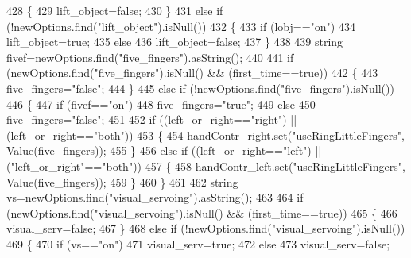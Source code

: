 \begin{DoxyCode}
428     \{
429         lift_object=\textcolor{keyword}{false};
430     \}
431     \textcolor{keywordflow}{else} \textcolor{keywordflow}{if} (!newOptions.find(\textcolor{stringliteral}{"lift\_object"}).isNull())
432     \{
433         \textcolor{keywordflow}{if} (lobj==\textcolor{stringliteral}{"on"})
434             lift_object=\textcolor{keyword}{true};
435         \textcolor{keywordflow}{else}
436             lift_object=\textcolor{keyword}{false};
437     \}
438 
439     \textcolor{keywordtype}{string} fivef=newOptions.find(\textcolor{stringliteral}{"five\_fingers"}).asString();
440 
441     \textcolor{keywordflow}{if} (newOptions.find(\textcolor{stringliteral}{"five\_fingers"}).isNull() && (first\_time==\textcolor{keyword}{true}))
442     \{
443         five\_fingers=\textcolor{stringliteral}{"false"};
444     \}
445     \textcolor{keywordflow}{else} \textcolor{keywordflow}{if} (!newOptions.find(\textcolor{stringliteral}{"five\_fingers"}).isNull())
446     \{
447         \textcolor{keywordflow}{if} (fivef==\textcolor{stringliteral}{"on"})
448             five\_fingers=\textcolor{stringliteral}{"true"};
449         \textcolor{keywordflow}{else} 
450             five\_fingers=\textcolor{stringliteral}{"false"};
451 
452         \textcolor{keywordflow}{if} ((left_or_right==\textcolor{stringliteral}{"right"}) || (left_or_right==\textcolor{stringliteral}{"both"}))
453         \{
454             handContr_right.set(\textcolor{stringliteral}{"useRingLittleFingers"}, Value(five\_fingers));
455         \}
456         \textcolor{keywordflow}{else} \textcolor{keywordflow}{if} ((left_or_right==\textcolor{stringliteral}{"left"}) || (\textcolor{stringliteral}{"left\_or\_right"}==\textcolor{stringliteral}{"both"}))
457         \{
458             handContr\_left.set(\textcolor{stringliteral}{"useRingLittleFingers"}, Value(five\_fingers));
459         \}
460     \}
461 
462     \textcolor{keywordtype}{string} vs=newOptions.find(\textcolor{stringliteral}{"visual\_servoing"}).asString();
463 
464     \textcolor{keywordflow}{if} (newOptions.find(\textcolor{stringliteral}{"visual\_servoing"}).isNull() && (first\_time==\textcolor{keyword}{true}))
465     \{
466         visual_serv=\textcolor{keyword}{false};
467     \}
468     \textcolor{keywordflow}{else} \textcolor{keywordflow}{if} (!newOptions.find(\textcolor{stringliteral}{"visual\_servoing"}).isNull())
469     \{
470         \textcolor{keywordflow}{if} (vs==\textcolor{stringliteral}{"on"})
471             visual_serv=\textcolor{keyword}{true};
472         \textcolor{keywordflow}{else}
473             visual_serv=\textcolor{keyword}{false};

\end{DoxyCode}
